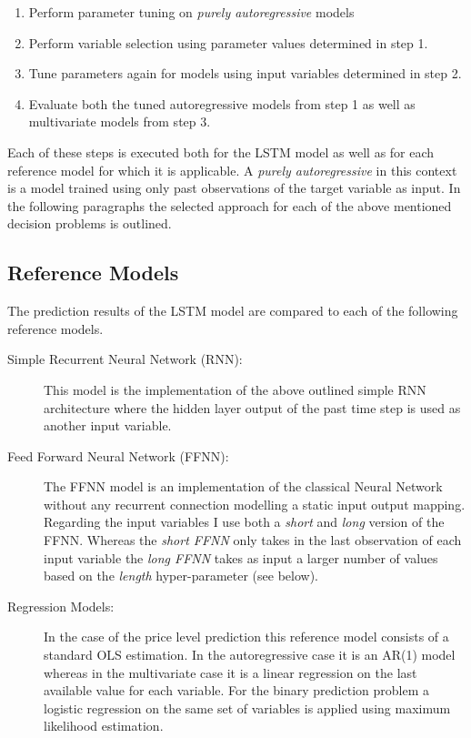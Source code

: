 \begin{enumerate}
\item Perform parameter tuning on \textit{purely autoregressive} models
\item Perform variable selection using parameter values determined in step 1.
\item Tune parameters again for models using input variables determined in step 2.
\item Evaluate both the tuned autoregressive models from step 1 as well as multivariate models from step 3. 
\end{enumerate}
Each of these steps is executed both for the LSTM model as well as for each reference model for which it is applicable.
A \textit{purely autoregressive} in this context is a model trained using only past observations of the target variable as input. In the following paragraphs the selected approach for each of the above mentioned decision problems is outlined.

\subsection{Reference Models}
The prediction results of the LSTM model are compared to each of the following reference models.
\begin{description}
\item[Simple Recurrent Neural Network (RNN):] This model is the implementation of the above outlined simple RNN architecture where the hidden layer output of the past time step is used as another input variable.
\item[Feed Forward Neural Network (FFNN):] The FFNN model is an implementation of the classical Neural Network without any recurrent connection modelling  a static input output mapping. Regarding the input variables I use both a \textit{short} and \textit{long} version of the FFNN. Whereas the \textit{short FFNN} only takes in the last observation of each input variable the \textit{long FFNN} takes as input a larger number of values based on the \textit{length} hyper-parameter (see below).
\item[Regression Models:] In the case of the price level prediction this reference model consists of a standard OLS estimation. In the autoregressive case it is an AR(1) model whereas in the multivariate case it is a linear regression on the last available value for each variable. For the binary prediction problem a logistic regression on the same set of variables is applied using maximum likelihood estimation.
\end{description}


